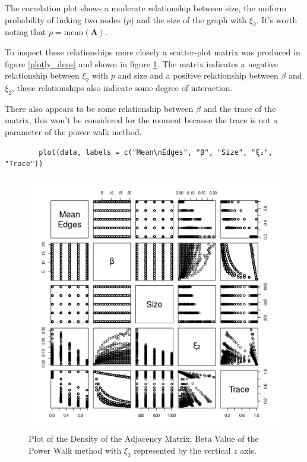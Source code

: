 \documentclass[11pt, twoside]{report}
\begin{document}
The correlation plot shows a moderate relationship between size, the uniform probability of linking two nodes (\(p\)) and the size of the graph with \(\xi_{2}\). It's worth noting that \(p = \mathrm{mean}\left(\mathbf{A}\right)\).

To inspect these relationships more closely a scatter-plot matrix was produced in
figure \ref{plotly_dens} and shown in figure \ref{fig:plotly_dens}. The matrix indicates a
negative relationship between \(\xi_{2}\) with \(p\) and size and a positive
relationship between \(\beta\) and \(\xi_{2}\), these relationships also indicate some degree of interaction.


There also appears to be some relationship between \(\beta\) and the trace of the matrix, this won't be considered for the moment because the trace is not a parameter of the power walk method.

\begin{listing}[htbp]
    \begin{tcolorbox}
        \begin{verbatim}
        plot(data, labels = c("Mean\nEdges", "β", "Size", "ξ₂", "Trace"))
        \end{verbatim}
    \end{tcolorbox}
\caption{\label{plotly_dens} Plot Model Diagnostics for data corresponding to graphs, see figure \ref{fig:plotly_dens}}
\end{listing}


\begin{figure}[htbp]
\centering
\includegraphics[width=12cm]{media/cor_matrix-er.png}
\caption{\label{fig:plotly_dens}Plot of the Density of the Adjacency Matrix, Beta Value of the Power Walk method with \(\xi_{2}\) represented by the vertical \(z\) axis.}
\end{figure}
\end{document}
